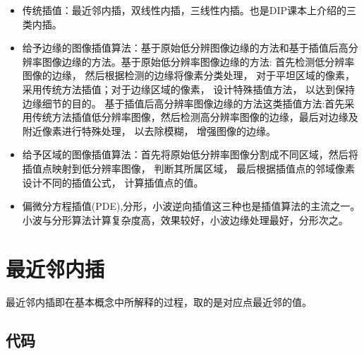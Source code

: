 \documentclass{article}
\begin{document}
\begin{itemize}

\item 传统插值：最近邻内插，双线性内插，三线性内插。也是DIP课本上介绍的三类内插。
\item 给予边缘的图像插值算法：基于原始低分辨图像边缘的方法和基于插值后高分辨率图像边缘的方法。基于原始低分辨率图像边缘的方法:
首先检测低分辨率图像的边缘， 然后根据检测的边缘将像素分类处理， 对于平坦区域的像素，采用传统方法插值；对于边缘区域的像素， 设计特殊插值方法， 以达到保持边缘细节的目的。
基于插值后高分辨率图像边缘的方法这类插值方法:首先采用传统方法插值低分辨率图像，然后检测高分辨率图像的边缘，最后对边缘及附近像素进行特殊处理， 以去除模糊， 增强图像的边缘。
\item 给予区域的图像插值算法：首先将原始低分辨率图像分割成不同区域，然后将插值点映射到低分辨率图像， 判断其所属区域， 最后根据插值点的邻域像素设计不同的插值公式， 计算插值点的值。
\item 偏微分方程插值(PDE),分形，小波逆向插值这三种也是插值算法的主流之一。小波与分形算法计算复杂度高，效果较好，小波边缘处理最好，分形次之。

\end{itemize}
\newpage

\section{最近邻内插}

最近邻内插即在基本概念中所解释的过程，取的是对应点最近邻的值。

\subsection{代码}
\end{document}
